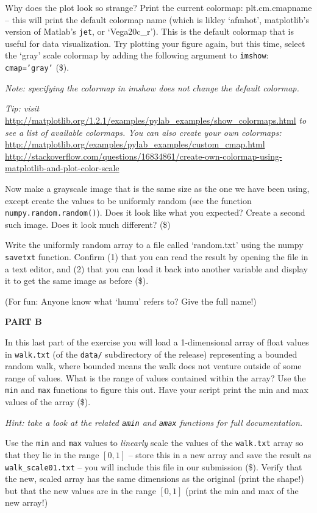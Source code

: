 \documentclass[10pt]{article}
\begin{document}
\begin{enumerate}
Why does the plot look so strange?  Print the current colormap: {plt.cm.cmapname} -- this will print the default colormap name (which is likley `afmhot', matplotlib's version of Matlab's {\tt jet}, or `Vega20c\_r').  This is the default colormap that is useful for data visualization.  Try plotting your figure again, but this time, select the `gray' scale colormap by adding the following argument to {\tt imshow}: {\tt cmap='gray'} (\$).

{\em Note: specifying the colormap in imshow does not change the default colormap.}

{\em Tip: visit} \url{http://matplotlib.org/1.2.1/examples/pylab_examples/show_colormaps.html} {\em to see a list of available colormaps.  You can also create your own colormaps:}\\
\url{http://matplotlib.org/examples/pylab_examples/custom_cmap.html}\\
\url{http://stackoverflow.com/questions/16834861/create-own-colormap-using-matplotlib-and-plot-color-scale}

Now make a grayscale image that is the same size as the one we have been using, except create the values to be uniformly random (see the function {\tt numpy.random.random()}).  Does it look like what you expected?  Create a second such image.  Does it look much different? (\$)

Write the uniformly random array to a file called `random.txt' using the numpy {\tt savetxt} function.  Confirm (1) that you can read the result by opening the file in a text editor, and (2) that you can load it back into another variable and display it to get the same image as before (\$).

(For fun: Anyone know what `humu' refers to?  Give the full name!)

\textbf{PART B}

In this last part of the exercise you will load a 1-dimensional array of float values in {\tt walk.txt} (of the {\tt data/} subdirectory of the release) representing a bounded random walk, where bounded means the walk does not venture outside of some range of values.  What is the range of values contained within the array?  Use the {\tt min} and {\tt max} functions to figure this out.  Have your script print the min and max values of the array (\$).

{\em Hint: take a look at the related {\tt amin} and {\tt amax} functions for full documentation.}

Use the {\tt min} and {\tt max} values to {\em linearly} scale the values of the {\tt walk.txt} array so that they lie in the range $[0, 1]$ -- store this in a new array and save the result as {\tt walk\_scale01.txt} -- you will include this file in our submission (\$).  Verify that the new, scaled array has the same dimensions as the original (print the shape!) but that the new values are in the range $[0, 1]$ (print the min and max of the new array!) 


\end{enumerate}
\end{document}
